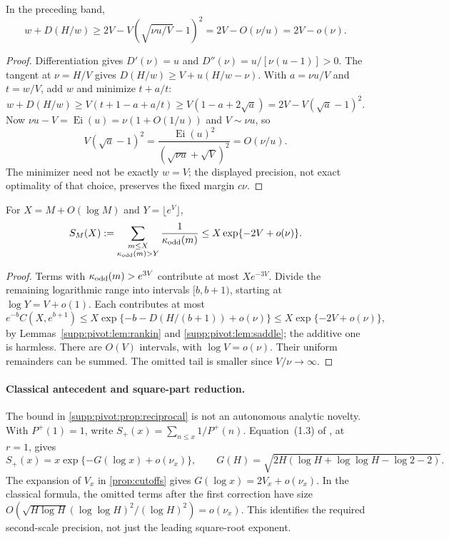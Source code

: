 \begin{lemma}\label{supp:pivot:lem:saddle}
In the preceding band,
\begin{equation}\label{supp:pivot:eq:saddle}
 w+D(H/w)\ge2V-V\left(\sqrt{\nu u/V}-1\right)^2
              =2V-O(\nu/u)=2V-o(\nu).
\end{equation}
\end{lemma}
\begin{proof}
Differentiation gives $D'(\nu)=u$ and
$D''(\nu)=u/[\nu(u-1)]>0$. The tangent at $\nu=H/V$ gives
$D(H/w)\ge V+u(H/w-\nu)$.
With $a=\nu u/V$ and $t=w/V$, add $w$ and minimize $t+a/t$:
\[
 w+D(H/w)\ge V(t+1-a+a/t)
                 \ge V(1-a+2\sqrt a)=2V-V(\sqrt a-1)^2.
\]
Now $\nu u-V=\operatorname{Ei}(u)=\nu(1+O(1/u))$ and $V\sim\nu u$, so
\[
 V(\sqrt a-1)^2
 =\frac{\operatorname{Ei}(u)^2}{(\sqrt{\nu u}+\sqrt V)^2}
 =O(\nu/u).
\]
The minimizer need not be exactly $w=V$; the displayed precision, not exact optimality of that choice, preserves the fixed margin $c\nu$.
\end{proof}

\begin{proposition}\label{supp:pivot:prop:reciprocal}\label{C-PIVOT-RECIP}
For $X=M+O(\log M)$ and $Y=\lfloor e^V\rfloor$,
\begin{equation}\label{supp:pivot:eq:reciprocal}
 S_M(X):=\sum_{\substack{m\le X\\\kappa_{\rm odd}(m)>Y}}
                 \frac1{\kappa_{\rm odd}(m)}
       \le X\exp\{-2V+o(\nu)\}.
\end{equation}
\end{proposition}
\begin{proof}
Terms with $\kappa_{\rm odd}(m)>e^{3V}$ contribute at most $Xe^{-3V}$.
Divide the remaining logarithmic range into intervals $[b,b+1)$, starting at
$\log Y=V+o(1)$. Each contributes at most
\[
 e^{-b}C(X,e^{b+1})
 \le X\exp\{-b-D(H/(b+1))+o(\nu)\}
 \le X\exp\{-2V+o(\nu)\},
\]
by Lemmas~\ref{supp:pivot:lem:rankin} and \ref{supp:pivot:lem:saddle}; the additive one is harmless. There are $O(V)$ intervals, with $\log V=o(\nu)$. Their uniform remainders can be summed. The omitted tail is smaller since $V/\nu\to\infty$.
\end{proof}

\paragraph{Classical antecedent and square-part reduction.}
The bound in \cref{supp:pivot:prop:reciprocal} is not an autonomous
analytic novelty. With $P^+(1)=1$, write
$S_+(x)=\sum_{n\le x}1/P^+(n)$.
Equation~(1.3) of \cite{ErdosIvicPomerance1986}, at $r=1$, gives
\[
 S_+(x)=x\exp\{-G(\log x)+o(\nu_x)\},\qquad
 G(H)=\sqrt{2H(\log H+\log\log H-\log2-2)}.
\]
The expansion of $V_x$ in \cref{prop:cutoffs} gives
$G(\log x)=2V_x+o(\nu_x)$. In the classical formula, the omitted
terms after the first correction have size
$O(\sqrt{H\log H}(\log\log H)^2/(\log H)^2)=o(\nu_x)$.
This identifies the required second-scale precision, not just the
leading square-root exponent.

